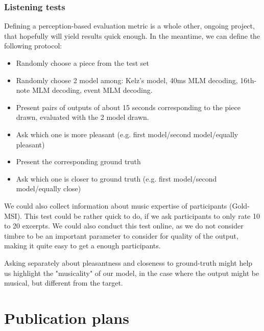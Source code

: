 \documentclass{article}
\begin{document}
\subsubsection{Listening tests}
\label{sec:listening}

Defining a perception-based evaluation metric is a whole other, ongoing project, that hopefully will yield results quick enough.
In the meantime, we can define the following protocol:

\begin{itemize}
\item Randomly choose a piece from the test set
\item Randomly choose 2 model among: Kelz's model, 40ms MLM decoding, 16th-note MLM decoding, event MLM decoding.
\item Present pairs of outputs of about 15 seconds corresponding to the piece drawn, evaluated with the 2 model drawn.
\item Ask which one is more pleasant (e.g. first model/second model/equally pleasant)
\item Present the corresponding ground truth 
\item Ask which one is closer to ground truth (e.g. first model/second model/equally close)
\end{itemize}

We could also collect information about music expertise of participants (Gold-MSI).
This test could be rather quick to do, if we ask participants to only rate 10 to 20 excerpts.
We could also conduct this test online, as we do not consider timbre to be an important parameter
to consider for quality of the output, making it quite easy to get a enough participants.

Asking separately about pleasantness and closeness to ground-truth might help us highlight the "musicality" of our model, in the case where the output might be musical, but different from the target.

\section{Publication plans}
\end{document}

